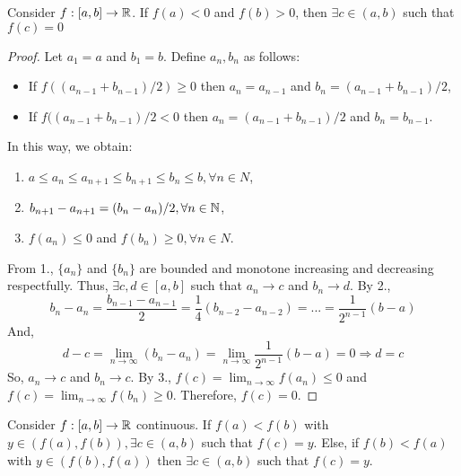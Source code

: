 \begin{theorem}
    Consider $f: [a,b] \to \mathbb{R}$. If $f(a) < 0$ and $f(b) > 0$, then $\exists c \in (a,b)$ such that $f(c) = 0$
\end{theorem}

\begin{proof}
    Let $a_1 = a$ and $b_1 = b$. Define $a_n, b_n$ as follows:
    \begin{itemize}
        \item If $f((a_{n-1} + b_{n-1})/2) \geq 0$ then $a_n = a_{n-1}$ and $b_n = (a_{n-1} + b_{n-1})/2$,
        \item If $f((a_{n-1} + b_{n-1})/2 < 0$ then $a_n = (a_{n-1}+b_{n-1})/2$ and $b_n = b_{n-1}$.
    \end{itemize}
    In this way, we obtain:
    \begin{enumerate}
        \item $a \leq a_n \leq a_{n+1} \leq b_{n+1} \leq b_n \leq b, \forall n \in N$,
        \item $b_{n+1} - a_{n+1} = (b_n - a_n)/2, \forall n \in \mathbb{N}$,
        \item $f(a_n) \leq 0$ and $f(b_n) \geq 0, \forall n \in N$.
    \end{enumerate}
    From 1., $\{a_n\}$ and $\{b_n\}$ are bounded and monotone increasing and decreasing respectfully. Thus, $\exists c, d \in [a,b]$ such that $a_n \to c$ and $b_n \to d$. By 2.,
    \begin{equation*}
        b_n - a_n = \frac{b_{n-1} - a_{n-1}}{2} = \frac{1}{4}(b_{n-2} - a_{n-2}) = ... = \frac{1}{2^{n-1}}(b-a)
    \end{equation*}
    And,
    \begin{equation*}
        d - c = \lim \limits_{n \to \infty} (b_n - a_n) = \lim \limits_{n \to \infty} \frac{1}{2^{n-1}} (b-a) = 0 \Longrightarrow d = c
    \end{equation*}
    So, $a_n \to c$ and $b_n \to c$. By 3., $f(c) = \lim_{n \to \infty} f(a_n) \leq 0$ and $f(c) = \lim_{n \to  \infty} f(b_n) \geq 0$. Therefore, $f(c) = 0$.
\end{proof}

\begin{theorem}
    Consider $f: [a,b] \to \mathbb{R}$ continuous. If $f(a) < f(b)$ with $y \in (f(a), f(b)), \exists c \in (a,b)$ such that $f(c) = y$. Else, if $ f(b) < f(a)$ with $y \in (f(b), f(a))$ then $\exists c \in (a,b)$ such that $f(c) = y$.
\end{theorem}

